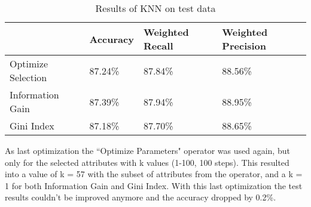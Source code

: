 \begin{table}[h]
\begin{tabular}{@{}llll@{}}
\toprule
                                        & Accuracy & Weighted Recall & Weighted Precision \\ \midrule
\multicolumn{1}{l|}{Optimize Selection} & 87.24\%  & 87.84\%         & 88.56\%            \\
\multicolumn{1}{l|}{Information Gain}          & 87.39\%  & 87.94\%         & 88.95\%            \\
\multicolumn{1}{l|}{Gini Index}         & 87.18\%  & 87.70\%         & 88.65\%            \\ \bottomrule
\end{tabular}
\label{Tab:KNNResults}
\caption{Results of KNN on test data}
\end{table}

As last optimization the ``Optimize Parameters" operator was used again, but only for the selected attributes with k values (1-100, 100 steps). This resulted into a value of k = 57 with the subset of attributes from the operator, and a k = 1 for both Information Gain and Gini Index. With this last optimization the test results couldn't be improved anymore and the accuracy dropped by 0.2\%.
